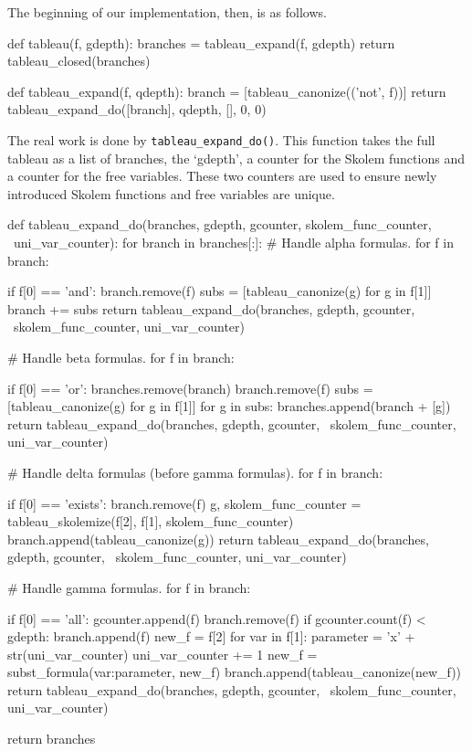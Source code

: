 \documentclass[a4paper,notitlepage]{scrartcl}
\begin{document}
The beginning of our implementation, then, is as follows.

\begin{code}
def tableau(f, gdepth):
    branches = tableau_expand(f, gdepth)
    return tableau_closed(branches)

def tableau_expand(f, qdepth):
    branch = [tableau_canonize(('not', f))]
    return tableau_expand_do([branch], qdepth, [], 0, 0)
\end{code}

The real work is done by \texttt{tableau\_expand\_do()}. This function takes
the full tableau as a list of branches, the `gdepth', a counter for the Skolem
functions and a counter for the free variables. These two counters are used to
ensure newly introduced Skolem functions and free variables are unique.

\begin{code}
def tableau_expand_do(branches, gdepth, gcounter, skolem_func_counter, \
uni_var_counter):
    for branch in branches[:]:
        # Handle alpha formulas.
        for f in branch:

            if f[0] == 'and':
                branch.remove(f)
                subs = [tableau_canonize(g) for g in f[1]]
                branch += subs
                return tableau_expand_do(branches, gdepth, gcounter, \
		    skolem_func_counter, uni_var_counter)

        # Handle beta formulas.
        for f in branch:

            if f[0] == 'or':
                branches.remove(branch)
                branch.remove(f)
                subs = [tableau_canonize(g) for g in f[1]]
                for g in subs:
                    branches.append(branch + [g])
                return tableau_expand_do(branches, gdepth, gcounter, \
		    skolem_func_counter, uni_var_counter)

        # Handle delta formulas (before gamma formulas).
        for f in branch:

            if f[0] == 'exists':
                branch.remove(f)
                g, skolem_func_counter = tableau_skolemize(f[2], f[1],
                    skolem_func_counter)
                branch.append(tableau_canonize(g))
                return tableau_expand_do(branches, gdepth, gcounter, \
		    skolem_func_counter, uni_var_counter)

        # Handle gamma formulas.
        for f in branch:

            if f[0] == 'all':
                gcounter.append(f)
                branch.remove(f)
                if gcounter.count(f) < gdepth:
                    branch.append(f)
                new_f = f[2]
                for var in f[1]:
                    parameter =  'x' + str(uni_var_counter)
                    uni_var_counter += 1
                    new_f = subst_formula({var:parameter}, new_f)
                branch.append(tableau_canonize(new_f))
                return tableau_expand_do(branches, gdepth, gcounter, \
		    skolem_func_counter, uni_var_counter)

    return branches
\end{code}
\end{document}
